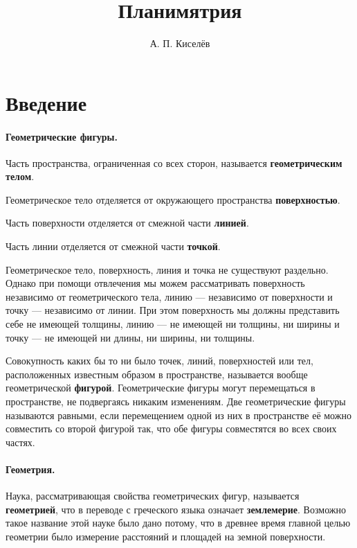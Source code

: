 \documentclass[oneside]{book}
\begin{document}
\frontmatter
\title{Планимятрия}
\author{
А. П. Киселёв
}
\date{}
\maketitle
\thispagestyle{empty}
\newpage
\mainmatter
\section*{Введение}

\paragraph{Геометрические фигуры.}\label{1938/1}
Часть пространства, ограниченная со всех сторон, называется \textbf{геометрическим телом}.

Геометрическое тело отделяется от окружающего пространства \textbf{поверхностью}.

Часть поверхности отделяется от смежной части \textbf{линией}.

Часть линии отделяется от смежной части \textbf{точкой}.

Геометрическое тело, поверхность, линия и точка не существуют раздельно.
Однако при помощи отвлечения мы можем рассматривать поверхность независимо от геометрического тела, линию — независимо от поверхности и точку — независимо от линии.
При этом поверхность мы должны представить себе не имеющей толщины, линию — не имеющей ни толщины, ни ширины и точку — не имеющей ни длины, ни ширины, ни толщины.

Совокупность каких бы то ни было точек, линий, поверхностей или тел, расположенных известным образом в пространстве, называется вообще геометрической \textbf{фигурой}.
Геометрические фигуры могут перемещаться в пространстве, не подвергаясь никаким изменениям.
Две геометрические фигуры называются равными, если перемещением одной из них в пространстве её можно совместить со второй фигурой так, что обе фигуры совместятся во всех своих частях.

\paragraph{Геометрия.}\label{1938/2}
Наука, рассматривающая свойства геометрических фигур, называется \textbf{геометрией}, что в переводе с греческого языка означает \textbf{землемерие}.
Возможно такое название этой науке было дано потому, что в древнее время главной целью геометрии было измерение расстояний и площадей на земной поверхности. 
\end{document}
